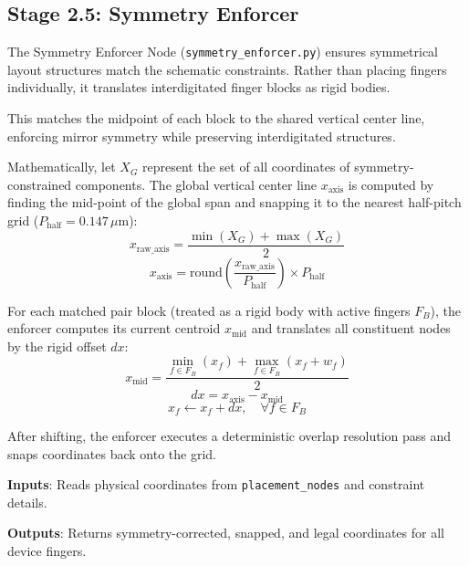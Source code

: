 \subsection{Stage 2.5: Symmetry Enforcer}
The Symmetry Enforcer Node (\texttt{symmetry\_enforcer.py}) ensures symmetrical layout structures match the schematic constraints. Rather than placing fingers individually, it translates interdigitated finger blocks as rigid bodies.

This matches the midpoint of each block to the shared vertical center line, enforcing mirror symmetry while preserving interdigitated structures.

Mathematically, let $X_{G}$ represent the set of all coordinates of symmetry-constrained components. The global vertical center line $x_{\text{axis}}$ is computed by finding the mid-point of the global span and snapping it to the nearest half-pitch grid ($P_{\text{half}} = 0.147\,\mu\text{m}$):
\begin{equation}
    x_{\text{raw\_axis}} = \frac{\min(X_G) + \max(X_G)}{2}
\end{equation}
\begin{equation}
    x_{\text{axis}} = \text{round}\left( \frac{x_{\text{raw\_axis}}}{P_{\text{half}}} \right) \times P_{\text{half}}
\end{equation}

For each matched pair block (treated as a rigid body with active fingers $F_B$), the enforcer computes its current centroid $x_{\text{mid}}$ and translates all constituent nodes by the rigid offset $dx$:
\begin{equation}
    x_{\text{mid}} = \frac{\min_{f \in F_B} (x_f) + \max_{f \in F_B} (x_f + w_f)}{2}
\end{equation}
\begin{equation}
    dx = x_{\text{axis}} - x_{\text{mid}}
\end{equation}
\begin{equation}
    x_f \leftarrow x_f + dx, \quad \forall f \in F_B
\end{equation}

After shifting, the enforcer executes a deterministic overlap resolution pass and snaps coordinates back onto the grid.

\textbf{Inputs}: Reads physical coordinates from \texttt{placement\_nodes} and constraint details.

\textbf{Outputs}: Returns symmetry-corrected, snapped, and legal coordinates for all device fingers.

